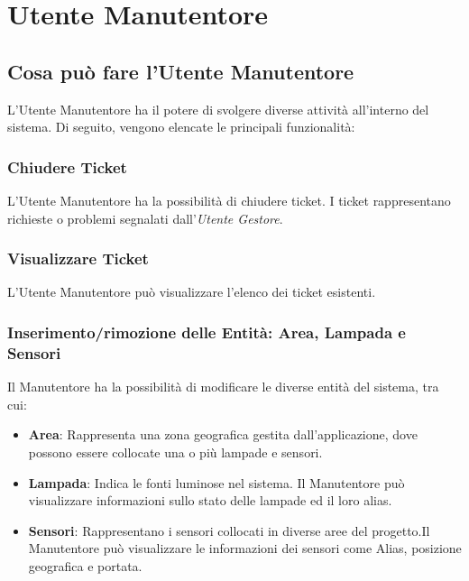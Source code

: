 \chapter{Utente Manutentore}

\section{Cosa può fare l'Utente Manutentore}
L'Utente Manutentore ha il potere di svolgere diverse attività all'interno del sistema. Di seguito, vengono elencate le principali funzionalità:

\subsection{Chiudere Ticket}
L'Utente Manutentore ha la possibilità di chiudere ticket. 
I ticket rappresentano richieste o problemi segnalati dall'\textit{Utente Gestore}.

\subsection{Visualizzare Ticket}
L'Utente Manutentore può visualizzare l'elenco dei ticket esistenti. 

\subsection{Inserimento/rimozione delle Entità: Area, Lampada e Sensori}
Il Manutentore ha la possibilità di modificare le diverse entità del sistema, tra cui:
\begin{itemize}
\item \textbf{Area}: Rappresenta una zona geografica gestita dall'applicazione, dove possono essere collocate una o più lampade e sensori. 
\item \textbf{Lampada}: Indica le fonti luminose nel sistema. Il Manutentore può visualizzare informazioni sullo stato delle lampade ed il loro alias.
\item \textbf{Sensori}: Rappresentano i sensori collocati in diverse aree del progetto.Il Manutentore può visualizzare le informazioni dei sensori come Alias, posizione geografica e portata.
\end{itemize}